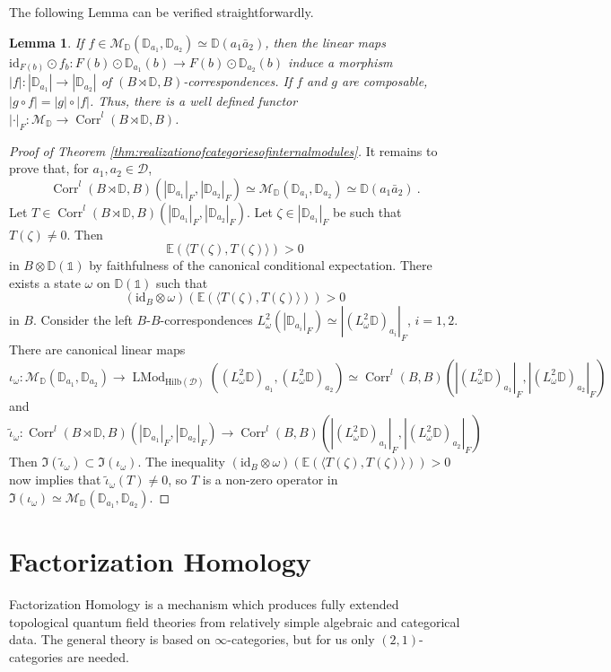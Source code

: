 \documentclass[a4paper,11pt,reqno]{amsart}
\numberwithin{equation}{section}
\newtheorem{lemma}[theorem]{Lemma}
\theoremstyle{remark}
\theoremstyle{definition}
\newcommand{\bE}{\mathbb E}
\newcommand{\bD}{\mathbb D}
\newcommand{\cD}{\mathcal D}
\newcommand{\cM}{\mathcal M}
\DeclareMathOperator{\LMod}{LMod}
\DeclareMathOperator{\Corr}{Corr}
\newcommand\un{{\mathds 1}}
\newcommand{\id}{\mathrm{id}}
\newcommand{\Hilb}{\mathrm{Hilb}}
\begin{document}
The following Lemma can be verified straightforwardly.
\begin{lemma}
	If $f \in \cM_\bD(\bD_{a_1}, \bD_{a_2}) \simeq \bD(a_1 \bar{a}_2)$, then the linear maps $\id_{F(b)} \odot f_b: F(b) \odot \bD_{a_1}(b) \to F(b) \odot \bD_{a_2}(b)$ induce a morphism $|f|: |\bD_{a_1}| \to |\bD_{a_2}|$ of $(B \rtimes \bD,B)$-correspondences. If $f$ and $g$ are composable, $|g \circ f| = |g| \circ |f|$. Thus, there is a well defined functor $| \cdot |_F: \cM_\bD \to \Corr^l(B \rtimes \bD, B)$.
\end{lemma}

\begin{proof}[Proof of Theorem \ref{thm:realizationofcategoriesofinternalmodules}]
   It remains to prove that, for $a_1, a_2 \in \cD$,
   \[
   \Corr^l(B \rtimes \bD, B) (|\bD_{a_1}|_F, |\bD_{a_2}|_F) \simeq \cM_{\bD}(\bD_{a_1}, \bD_{a_2}) \simeq \bD(a_1 \bar{a}_2) \ . 
   \]
   Let $T \in \Corr^l(B \rtimes \bD, B) (|\bD_{a_1}|_F, |\bD_{a_2}|_F)$. Let $\zeta \in |\bD_{a_1}|_F$ be such that $T(\zeta) \neq 0$. Then 
   \[ 
   \bE (\langle T(\zeta), T(\zeta)\rangle) > 0 
   \] 
   in $B \otimes \bD(\un)$ by faithfulness of the canonical conditional expectation. There exists a state $\omega$ on $\bD(\un)$ such that 
   \[
   (\id_B \otimes \omega) ( \bE (\langle T(\zeta), T(\zeta)\rangle)) > 0 \]
   in $B$. Consider the left $B$-$B$-correspondences $L^2_\omega(|\bD_{a_i}|_F) \simeq |(L^2_\omega \bD)_{a_i}|_F$, $i =1,2$. There are canonical linear maps
   \[
   \iota_\omega: \cM_\bD(\bD_{a_1},\bD_{a_2}) \to \LMod_{\Hilb(\cD)}((L^2_\omega \bD)_{a_1}, (L^2_\omega \bD)_{a_2}) \simeq \Corr^l(B,B)( |(L^2_\omega \bD)_{a_1}|_F,  |(L^2_\omega \bD)_{a_2}|_F)
   \]
   and
   \[
   \tilde{\iota}_\omega: \Corr^l(B \rtimes \bD, B) (|\bD_{a_1}|_F, |\bD_{a_2}|_F) \to \Corr^l(B,B)( |(L^2_\omega \bD)_{a_1}|_F,  |(L^2_\omega \bD)_{a_2}|_F)
   \]
   Then $\Im(\tilde{\iota}_\omega) \subset \Im(\iota_\omega)$. The inequality $ (\id_B \otimes \omega) ( \bE (\langle T(\zeta), T(\zeta)\rangle)) > 0$ now implies that $\tilde{\iota}_\omega(T) \neq 0$, so $T$ is a non-zero operator in $\Im(\iota_\omega) \simeq \cM_\bD(\bD_{a_1},\bD_{a_2})$.
\end{proof}



\section{Factorization Homology}

Factorization Homology is a mechanism which produces fully extended topological quantum field theories from relatively simple algebraic and categorical data. The general theory is based on $\infty$-categories, but for us only $(2,1)$-categories are needed.
\end{document}
